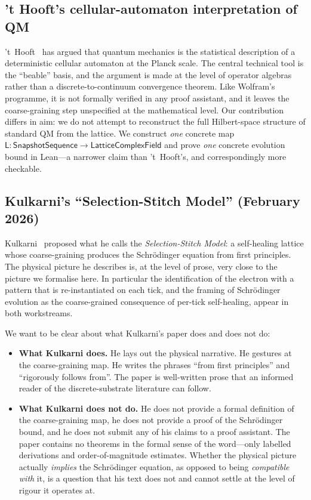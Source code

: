 \documentclass[11pt,a4paper,twoside]{article}
\theoremstyle{definition}
\newcommand{\Lmap}{\mathsf{L}}
\newcommand{\Lfield}{\mathsf{LatticeComplexField}}
\newcommand{\SnapSeq}{\mathsf{SnapshotSequence}}
\begin{document}
\subsection{'t Hooft's cellular-automaton interpretation of QM}\label{sec:prior-thooft}

't~Hooft~\cite{tHooft2014,tHooft2016} has argued that quantum mechanics
is the statistical description of a deterministic cellular automaton
at the Planck scale. The central technical tool is the ``beable''
basis, and the argument is made at the level of operator algebras
rather than a discrete-to-continuum convergence theorem. Like
Wolfram's programme, it is not formally verified in any proof
assistant, and it leaves the coarse-graining step unspecified at the
mathematical level. Our contribution differs in aim: we do not attempt
to reconstruct the full Hilbert-space structure of standard QM from
the lattice. We construct \emph{one} concrete map
$\Lmap:\SnapSeq\to\Lfield$ and prove \emph{one} concrete evolution
bound in Lean---a narrower claim than 't~Hooft's, and correspondingly
more checkable.

\subsection{Kulkarni's ``Selection-Stitch Model''
(February 2026)}\label{sec:prior-kulkarni}

Kulkarni~\cite{Kulkarni2026} proposed what he calls the
\emph{Selection-Stitch Model}: a self-healing lattice whose
coarse-graining produces the Schr\"odinger equation from first
principles. The physical picture he describes is, at the level of
prose, very close to the picture we formalise here. In particular the
identification of the electron with a pattern that is re-instantiated
on each tick, and the framing of Schr\"odinger evolution as the
coarse-grained consequence of per-tick self-healing, appear in both
workstreams.

We want to be clear about what Kulkarni's paper does and does not do:
\begin{itemize}
\item \textbf{What Kulkarni does.} He lays out the physical narrative.
  He gestures at the coarse-graining map. He writes the phrases
  ``from first principles'' and ``rigorously follows from''. The paper
  is well-written prose that an informed reader of the
  discrete-substrate literature can follow.
\item \textbf{What Kulkarni does not do.} He does not provide a formal
  definition of the coarse-graining map, he does not provide a proof of
  the Schr\"odinger bound, and he does not submit any of his claims to a
  proof assistant. The paper contains no theorems in the formal sense
  of the word---only labelled derivations and order-of-magnitude
  estimates. Whether the physical picture actually \emph{implies} the
  Schr\"odinger equation, as opposed to being \emph{compatible with}
  it, is a question that his text does not and cannot settle at the
  level of rigour it operates at.
\end{itemize}
\end{document}
